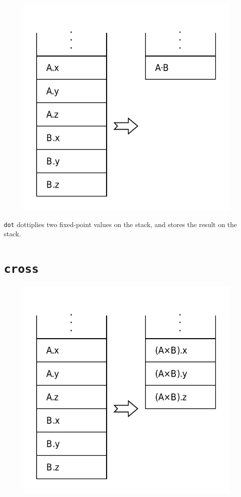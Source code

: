 	\begin{figure}
		\begin{flushright}
			\includegraphics[width=0.9\linewidth]{figure/pdf/i_dot} 
		\end{flushright}
	\end{figure}

		\texttt{dot} dottiplies two fixed-point values on the stack, and stores
		the result on the stack.

\section*{\texttt{cross}}

	\begin{figure}
		\begin{flushright}
			\includegraphics[width=0.9\linewidth]{figure/pdf/i_cross} 
		\end{flushright}
	\end{figure}

